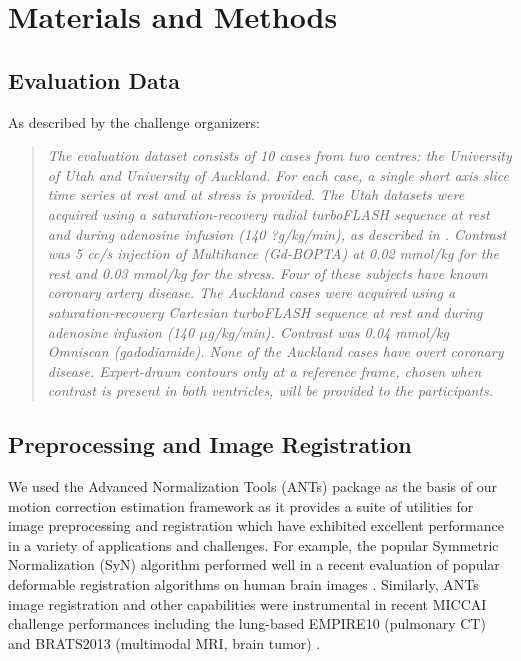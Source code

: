 \documentclass{llncs}
\begin{document}
\section{Materials and Methods}

\subsection{Evaluation Data}

As described by the challenge organizers:
\begin{quote}
{\it
The evaluation dataset consists of 10 cases from two centres: the University of Utah and University of Auckland. For each case, a single short axis slice time series at rest and at stress is provided. The Utah datasets were acquired using a saturation-recovery radial turboFLASH sequence at rest and during adenosine infusion (140 ?g/kg/min), as described in \cite{dibella2012}. Contrast was 5 cc/s injection of Multihance (Gd-BOPTA) at 0.02 mmol/kg for the rest and 0.03 mmol/kg for the stress. Four of these subjects have known coronary artery disease. The Auckland cases were acquired using a saturation-recovery Cartesian turboFLASH sequence at rest and during adenosine infusion (140 $\mu$g/kg/min). Contrast was 0.04 mmol/kg Omniscan (gadodiamide). None of the Auckland cases have overt coronary disease.  Expert-drawn contours only at a reference frame, chosen when contrast is present in both ventricles, will be provided to the participants. 
}
\end{quote}

\subsection{Preprocessing and Image Registration}

We used the Advanced Normalization Tools (ANTs)
package as the basis of our motion correction estimation framework as it provides 
a suite of utilities for image preprocessing and registration which have exhibited 
excellent performance in a variety of applications and challenges.  For example, 
the popular Symmetric Normalization (SyN) algorithm \cite{avants2008,avants2011}
performed well in a recent evaluation of popular deformable registration 
algorithms on human brain images \cite{klein2009}.  Similarly, ANTs image registration and other 
capabilities were instrumental in recent MICCAI challenge performances including 
the lung-based EMPIRE10 (pulmonary CT) \cite{murphy2011} and BRATS2013 
(multimodal MRI, brain tumor) \cite{menze2014}.
\end{document}
